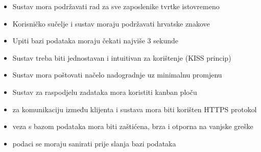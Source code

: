 			 \begin{itemize}
			 \item Sustav mora podržavati rad za sve zaposlenike tvrtke istovremeno 
			 \item Korisničko sučelje i sustav moraju podržavati hrvatske znakove
			 \item Upiti bazi podataka moraju čekati najviše 3 sekunde
			 \item Sustav treba biti jednostavan i intuitivan za korištenje (KISS princip)
			 \item Sustav mora poštovati načelo nadogradnje uz minimalnu promjenu
			 \item Sustav za raspodjelu zadataka mora koristiti kanban ploču
			 \item za komunikaciju između klijenta i sustava mora biti korišten HTTPS protokol
			 \item veza s bazom podataka mora biti zaštićena, brza i otporna na vanjske greške
			 \item podaci se moraju sanirati prije slanja bazi podataka
			 \end{itemize}
